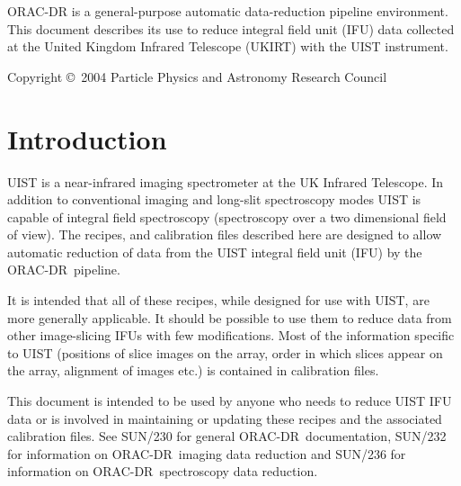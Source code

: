 \documentclass[twoside,11pt]{article}
\newcommand{\stardocinitials}  {SUN}
\newcommand{\stardoccopyright} {Copyright \copyright\ 2004 Particle Physics and Astronomy Research Council}
\newcommand{\stardocnumber}    {246.2}
\newcommand{\stardocabstract}  {ORAC-DR is a
general-purpose automatic data-reduction pipeline environment.  This
document describes its use to reduce integral field unit (IFU) data
collected at the United Kingdom Infrared Telescope (UKIRT) with the
UIST instrument. }
\newcommand{\stardocname}{\stardocinitials /\stardocnumber}
\newenvironment{latexonly}{}{}
\newcommand{\xref}[3]{#1}
\renewcommand{\_}{\texttt{\symbol{95}}}
\newcommand{\ORACDR}{{\footnotesize ORAC-DR}}
\renewcommand{\thepage}{\roman{page}}
\begin{document}
\stardocabstract

\begin{latexonly}
\newpage
\vspace*{\fill}
\stardoccopyright
\end{latexonly}

  \newpage
  \begin{latexonly}
    \setlength{\parskip}{0mm}
    \tableofcontents
    \setlength{\parskip}{\medskipamount}
    \markboth{\stardocname}{\stardocname}
  \end{latexonly}

\cleardoublepage
\renewcommand{\thepage}{\arabic{page}}
\setcounter{page}{1}



\section{Introduction}

UIST is a near-infrared imaging spectrometer at the UK Infrared
Telescope. In addition to conventional imaging and long-slit
spectroscopy modes UIST is capable of integral field spectroscopy
(spectroscopy over a two dimensional field of view). The recipes,
and calibration files described here are designed to allow
automatic reduction of data from the UIST integral field unit (IFU) by
the \ORACDR\ pipeline.

It is intended that all of these recipes, while designed for use with
UIST, are more generally applicable. It should be possible to use them
to reduce data from other image-slicing IFUs with few
modifications. Most of the information specific to UIST (positions of
slice images on the array, order in which slices appear on the array,
alignment of images etc.) is contained in calibration files.

This document is intended to be used by anyone who needs to reduce
UIST IFU data or is involved in maintaining or updating these recipes
and the associated calibration files. See \xref{SUN/230}{sun230}{} for
general \ORACDR\ documentation, \xref{SUN/232}{sun232}{} for
information on \ORACDR\ imaging data reduction and
\xref{SUN/236}{sun236}{} for information on \ORACDR\ spectroscopy data
reduction.
\end{document}
